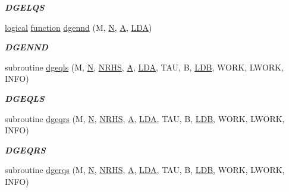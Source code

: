 \begin{DoxyCompactItemize}
\begin{DoxyCompactList}\small\item\em {\bfseries D\+G\+E\+L\+Q\+S} \end{DoxyCompactList}\item 
\hyperlink{tnc_8c_aa7b64cdf39500931f7b333343791a104}{logical} \hyperlink{afunc_8m_a7b5e596df91eadea6c537c0825e894a7}{function} \hyperlink{group__double__lin_ga77bd8652e962ed2597017d7481fcd575}{dgennd} (M, \hyperlink{polmisc_8c_a0240ac851181b84ac374872dc5434ee4}{N}, \hyperlink{classA}{A}, \hyperlink{example__user_8c_ae946da542ce0db94dced19b2ecefd1aa}{L\+D\+A})
\begin{DoxyCompactList}\small\item\em {\bfseries D\+G\+E\+N\+N\+D} \end{DoxyCompactList}\item 
subroutine \hyperlink{group__double__lin_ga2553cadb5535be38dad9a91a709d971c}{dgeqls} (M, \hyperlink{polmisc_8c_a0240ac851181b84ac374872dc5434ee4}{N}, \hyperlink{example__user_8c_aa0138da002ce2a90360df2f521eb3198}{N\+R\+H\+S}, \hyperlink{classA}{A}, \hyperlink{example__user_8c_ae946da542ce0db94dced19b2ecefd1aa}{L\+D\+A}, T\+A\+U, B, \hyperlink{example__user_8c_a50e90a7104df172b5a89a06c47fcca04}{L\+D\+B}, W\+O\+R\+K, L\+W\+O\+R\+K, I\+N\+F\+O)
\begin{DoxyCompactList}\small\item\em {\bfseries D\+G\+E\+Q\+L\+S} \end{DoxyCompactList}\item 
subroutine \hyperlink{group__double__lin_ga8ba05cbc763f56e2e25f04e018e807a7}{dgeqrs} (M, \hyperlink{polmisc_8c_a0240ac851181b84ac374872dc5434ee4}{N}, \hyperlink{example__user_8c_aa0138da002ce2a90360df2f521eb3198}{N\+R\+H\+S}, \hyperlink{classA}{A}, \hyperlink{example__user_8c_ae946da542ce0db94dced19b2ecefd1aa}{L\+D\+A}, T\+A\+U, B, \hyperlink{example__user_8c_a50e90a7104df172b5a89a06c47fcca04}{L\+D\+B}, W\+O\+R\+K, L\+W\+O\+R\+K, I\+N\+F\+O)
\begin{DoxyCompactList}\small\item\em {\bfseries D\+G\+E\+Q\+R\+S} \end{DoxyCompactList}\item 
subroutine \hyperlink{group__double__lin_gac646e7fcdad9422e2fb3184cc5aab6d2}{dgerqs} (M, \hyperlink{polmisc_8c_a0240ac851181b84ac374872dc5434ee4}{N}, \hyperlink{example__user_8c_aa0138da002ce2a90360df2f521eb3198}{N\+R\+H\+S}, \hyperlink{classA}{A}, \hyperlink{example__user_8c_ae946da542ce0db94dced19b2ecefd1aa}{L\+D\+A}, T\+A\+U, B, \hyperlink{example__user_8c_a50e90a7104df172b5a89a06c47fcca04}{L\+D\+B}, W\+O\+R\+K, L\+W\+O\+R\+K, I\+N\+F\+O)

\end{DoxyCompactItemize}
